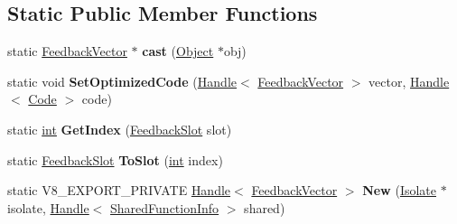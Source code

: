 \subsection*{Static Public Member Functions}
\begin{DoxyCompactItemize}
\item 
\mbox{\label{classv8_1_1internal_1_1FeedbackVector_a4dda422640f1bb3df2726d77a428e983}} 
static \mbox{\hyperlink{classv8_1_1internal_1_1FeedbackVector}{Feedback\+Vector}} $\ast$ {\bfseries cast} (\mbox{\hyperlink{classv8_1_1internal_1_1Object}{Object}} $\ast$obj)
\item 
\mbox{\label{classv8_1_1internal_1_1FeedbackVector_a30f7ed7ae28122241b09fed5e734e0b0}} 
static void {\bfseries Set\+Optimized\+Code} (\mbox{\hyperlink{classv8_1_1internal_1_1Handle}{Handle}}$<$ \mbox{\hyperlink{classv8_1_1internal_1_1FeedbackVector}{Feedback\+Vector}} $>$ vector, \mbox{\hyperlink{classv8_1_1internal_1_1Handle}{Handle}}$<$ \mbox{\hyperlink{classv8_1_1internal_1_1Code}{Code}} $>$ code)
\item 
\mbox{\label{classv8_1_1internal_1_1FeedbackVector_a9a8633e806a0c4a8f346d1b923941247}} 
static \mbox{\hyperlink{classint}{int}} {\bfseries Get\+Index} (\mbox{\hyperlink{classv8_1_1internal_1_1FeedbackSlot}{Feedback\+Slot}} slot)
\item 
\mbox{\label{classv8_1_1internal_1_1FeedbackVector_a054ae440e12f8e8824f822f0367e0a47}} 
static \mbox{\hyperlink{classv8_1_1internal_1_1FeedbackSlot}{Feedback\+Slot}} {\bfseries To\+Slot} (\mbox{\hyperlink{classint}{int}} index)
\item 
\mbox{\label{classv8_1_1internal_1_1FeedbackVector_a7809aa2a12723f4a67da6e6093d61e2a}} 
static V8\+\_\+\+E\+X\+P\+O\+R\+T\+\_\+\+P\+R\+I\+V\+A\+TE \mbox{\hyperlink{classv8_1_1internal_1_1Handle}{Handle}}$<$ \mbox{\hyperlink{classv8_1_1internal_1_1FeedbackVector}{Feedback\+Vector}} $>$ {\bfseries New} (\mbox{\hyperlink{classv8_1_1internal_1_1Isolate}{Isolate}} $\ast$isolate, \mbox{\hyperlink{classv8_1_1internal_1_1Handle}{Handle}}$<$ \mbox{\hyperlink{classv8_1_1internal_1_1SharedFunctionInfo}{Shared\+Function\+Info}} $>$ shared)
\item 

\end{DoxyCompactItemize}
